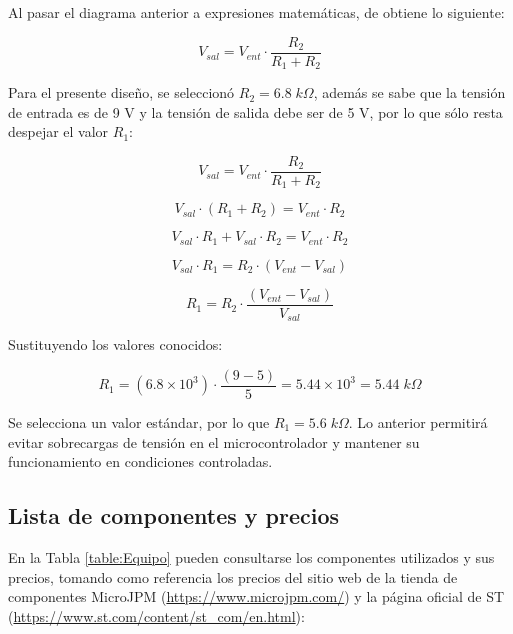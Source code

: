 Al pasar el diagrama anterior a expresiones matemáticas, de obtiene lo siguiente: 

\begin{equation}
    V_{sal} = V_{ent} \cdot \frac{R_{2}}{R_{1}+R_{2}} 
\end{equation}

Para el presente diseño, se seleccionó $R_{2} = 6.8 \; k\Omega$, además se sabe que la tensión de entrada es de 9 V y la tensión de salida debe ser de 5 V, por lo que sólo resta despejar el valor $R_1$: 

\begin{equation*}
    V_{sal} = V_{ent} \cdot \frac{R_{2}}{R_{1}+R_{2}} 
\end{equation*}

\begin{equation*}
    V_{sal} \cdot (R_{1}+R_{2}) = V_{ent} \cdot R_{2}
\end{equation*}

\begin{equation*}
    V_{sal} \cdot R_{1} + V_{sal} \cdot R_{2} = V_{ent} \cdot R_{2}
\end{equation*}

\begin{equation*}
    V_{sal} \cdot R_{1} = R_{2} \cdot (V_{ent} - V_{sal})
\end{equation*}

\begin{equation}
    R_{1} = R_{2} \cdot \frac{(V_{ent} - V_{sal})}{ V_{sal}}
\end{equation}

Sustituyendo los valores conocidos: 

\begin{equation}
    R_{1} = (6.8 \times 10^3) \cdot \frac{(9 - 5)}{5} = 5.44 \times 10^3 = 5.44 \; k\Omega
\end{equation}

Se selecciona un valor estándar, por lo que $R_1 = 5.6 \; k\Omega$. Lo anterior permitirá evitar sobrecargas de tensión en el microcontrolador y mantener su funcionamiento en condiciones controladas. 

\subsection{Lista de componentes y precios}

En la Tabla \ref{table:Equipo} pueden consultarse los componentes utilizados y sus precios, tomando como referencia los precios del sitio web de la tienda de componentes MicroJPM (\url{https://www.microjpm.com/}) y la página oficial de ST (\url{https://www.st.com/content/st_com/en.html}): 

